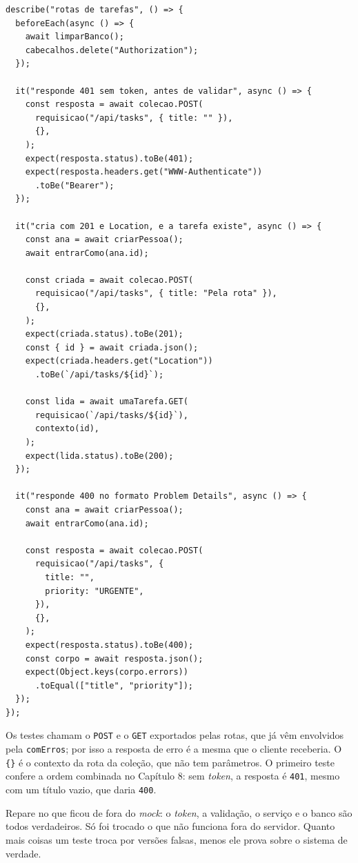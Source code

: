 \begin{codigo}
\begin{Verbatim}[breaklines=true, breaksymbolleft={}, fontsize=\footnotesize]
describe("rotas de tarefas", () => {
  beforeEach(async () => {
    await limparBanco();
    cabecalhos.delete("Authorization");
  });

  it("responde 401 sem token, antes de validar", async () => {
    const resposta = await colecao.POST(
      requisicao("/api/tasks", { title: "" }),
      {},
    );
    expect(resposta.status).toBe(401);
    expect(resposta.headers.get("WWW-Authenticate"))
      .toBe("Bearer");
  });

  it("cria com 201 e Location, e a tarefa existe", async () => {
    const ana = await criarPessoa();
    await entrarComo(ana.id);

    const criada = await colecao.POST(
      requisicao("/api/tasks", { title: "Pela rota" }),
      {},
    );
    expect(criada.status).toBe(201);
    const { id } = await criada.json();
    expect(criada.headers.get("Location"))
      .toBe(`/api/tasks/${id}`);

    const lida = await umaTarefa.GET(
      requisicao(`/api/tasks/${id}`),
      contexto(id),
    );
    expect(lida.status).toBe(200);
  });

  it("responde 400 no formato Problem Details", async () => {
    const ana = await criarPessoa();
    await entrarComo(ana.id);

    const resposta = await colecao.POST(
      requisicao("/api/tasks", {
        title: "",
        priority: "URGENTE",
      }),
      {},
    );
    expect(resposta.status).toBe(400);
    const corpo = await resposta.json();
    expect(Object.keys(corpo.errors))
      .toEqual(["title", "priority"]);
  });
});
\end{Verbatim}
\end{codigo}

Os testes chamam o \texttt{POST} e o \texttt{GET} exportados pelas rotas, que já vêm envolvidos pela \texttt{comErros}; por isso a resposta de erro é a mesma que o cliente receberia. O \texttt{\{\}} é o contexto da rota da coleção, que não tem parâmetros. O primeiro teste confere a ordem combinada no Capítulo 8: sem \textit{token}, a resposta é \texttt{401}, mesmo com um título vazio, que daria \texttt{400}.

Repare no que ficou de fora do \textit{mock}: o \textit{token}, a validação, o serviço e o banco são todos verdadeiros. Só foi trocado o que não funciona fora do servidor. Quanto mais coisas um teste troca por versões falsas, menos ele prova sobre o sistema de verdade.

